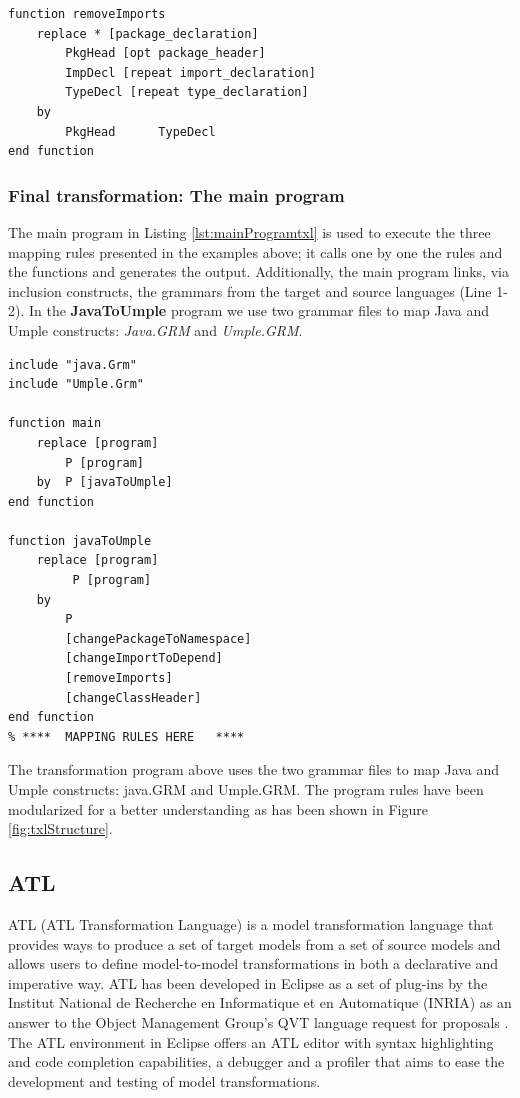 \begin{lstlisting}[style=umplePlain, label=lst:packageDeclRule2, caption=Helper Function used to remove the imports declarations] 
function removeImports  
    replace * [package_declaration]
        PkgHead [opt package_header]   
        ImpDecl [repeat import_declaration]  
        TypeDecl [repeat type_declaration] 
    by   
        PkgHead      TypeDecl
end function
\end{lstlisting}


\subsubsection{Final transformation: The main program}

The main program in Listing \ref{lst:mainProgramtxl} is used to execute the three mapping rules presented in the examples above; it calls one by one the rules and the functions and generates the output. Additionally, the main program links, via inclusion constructs, the grammars from the target and source languages (Line 1-2). In the \textbf{JavaToUmple} program we use two grammar files to map Java and Umple constructs: \textit{Java.GRM} and\textit{ Umple.GRM}.

\begin{lstlisting}[style=umplePlain, label=lst:mainProgramtxl, caption=The ATL main program - JavaToUmple.Txl] 
include "java.Grm" 
include "Umple.Grm" 

function main    
    replace [program]
        P [program]     
    by 	P [javaToUmple]
end function 

function javaToUmple   
    replace [program] 
         P [program]     
    by 
        P 
        [changePackageToNamespace] 
        [changeImportToDepend] 
        [removeImports] 
        [changeClassHeader]
end function 
% ****	MAPPING RULES HERE   ****
\end{lstlisting}

The transformation program above uses the two grammar files to map Java and Umple constructs:  java.GRM and Umple.GRM. The program rules have been modularized for a better understanding as has been shown in Figure \ref{fig:txlStructure}.

\subsection{ATL}

ATL (ATL Transformation Language) \cite{atl} is a model transformation language that provides ways to produce a set of target models from a set of source models and allows users to define model-to-model transformations in both a declarative and imperative way.
ATL has been developed in Eclipse as a set of plug-ins by the Institut National de Recherche en Informatique et en Automatique (INRIA) as an answer to the Object Management Group's QVT language request for proposals \cite{Jouault200831}.  The ATL environment in Eclipse offers an ATL editor with syntax highlighting and code completion capabilities, a debugger and a profiler that aims to ease the development and testing of model transformations.

